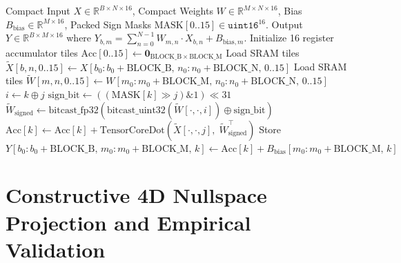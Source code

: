 \documentclass[11pt,a4paper]{article}
\theoremstyle{definition}
\theoremstyle{remark}
\newcommand{\R}{\mathbb{R}}
\begin{document}
\begin{algorithm}[h!]
\caption{Fused SRAM-Tiled Sedenion Linear Kernel \& ONNX Custom Op (\texttt{ai.sedenion::FusedSedenionLinear})}
\label{alg:sedenion_kernel}
\small
\begin{algorithmic}[1]
\Require Compact Input $X \in \R^{B \times N \times 16}$, Compact Weights $W \in \R^{M \times N \times 16}$, Bias $B_{\mathrm{bias}} \in \R^{M \times 16}$, Packed Sign Masks $\mathrm{MASK}[0..15] \in \mathtt{uint16}^{16}$.
\Ensure Output $Y \in \R^{B \times M \times 16}$ where $Y_{b,m} = \sum_{n=0}^{N-1} W_{m,n} \cdot X_{b,n} + B_{\mathrm{bias},m}$.
    \State Initialize 16 register accumulator tiles $\mathrm{Acc}[0..15] \leftarrow \mathbf{0}_{\mathrm{BLOCK\_B} \times \mathrm{BLOCK\_M}}$
        \State Load SRAM tiles $\tilde{X}[b, n, 0..15] \leftarrow X[b_0:b_0+\mathrm{BLOCK\_B}, \, n_0:n_0+\mathrm{BLOCK\_N}, \, 0..15]$
        \State Load SRAM tiles $\tilde{W}[m, n, 0..15] \leftarrow W[m_0:m_0+\mathrm{BLOCK\_M}, \, n_0:n_0+\mathrm{BLOCK\_N}, \, 0..15]$
            \State $i \leftarrow k \oplus j$ 
            \State $\mathrm{sign\_bit} \leftarrow ((\mathrm{MASK}[k] \gg j) \mathbin{\&} 1) \ll 31$
            \State $\tilde{W}_{\mathrm{signed}} \leftarrow \mathrm{bitcast\_fp32}(\mathrm{bitcast\_uint32}(\tilde{W}[\cdot, \cdot, i]) \oplus \mathrm{sign\_bit})$
            \State $\mathrm{Acc}[k] \leftarrow \mathrm{Acc}[k] + \mathrm{TensorCoreDot}(\tilde{X}[\cdot, \cdot, j], \; \tilde{W}_{\mathrm{signed}}^\top)$
        \EndFor
    \EndFor
        \State Store $Y[b_0:b_0+\mathrm{BLOCK\_B}, \, m_0:m_0+\mathrm{BLOCK\_M}, \, k] \leftarrow \mathrm{Acc}[k] + B_{\mathrm{bias}}[m_0:m_0+\mathrm{BLOCK\_M}, \, k]$
    \EndFor
\EndFor
\end{algorithmic}
\end{algorithm}

\section{Constructive 4D Nullspace Projection and Empirical Validation}
\label{sec:wp4}
\end{document}
